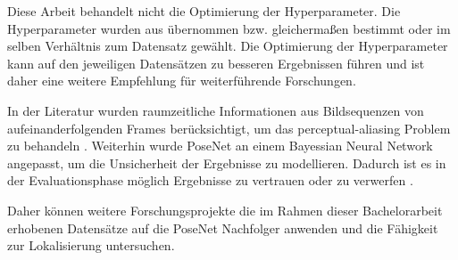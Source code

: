 Diese Arbeit behandelt nicht die Optimierung der Hyperparameter. Die Hyperparameter wurden aus \citet{acharyaBIMPoseNetIndoorCamera2019} übernommen bzw. gleichermaßen bestimmt oder im selben Verhältnis zum Datensatz gewählt. Die Optimierung der Hyperparameter kann auf den jeweiligen Datensätzen zu besseren Ergebnissen führen und ist daher eine weitere Empfehlung für weiterführende Forschungen. 

In der Literatur wurden raumzeitliche Informationen aus Bildsequenzen von aufeinanderfolgenden Frames berücksichtigt, um das perceptual-aliasing Problem zu behandeln \cite{walchImageBasedLocalizationUsing2017, clarkVidLocDeepSpatioTemporal2017}. Weiterhin wurde PoseNet an einem Bayessian Neural Network angepasst, um die Unsicherheit der Ergebnisse zu modellieren. Dadurch ist es in der Evaluationsphase möglich Ergebnisse zu vertrauen oder zu verwerfen \cite{kendallModellingUncertaintyDeep2016}. 


Daher können weitere Forschungsprojekte die im Rahmen dieser Bachelorarbeit erhobenen Datensätze auf die PoseNet Nachfolger \cite{kendallModellingUncertaintyDeep2016, walchImageBasedLocalizationUsing2017, clarkVidLocDeepSpatioTemporal2017} anwenden und die Fähigkeit zur Lokalisierung untersuchen.